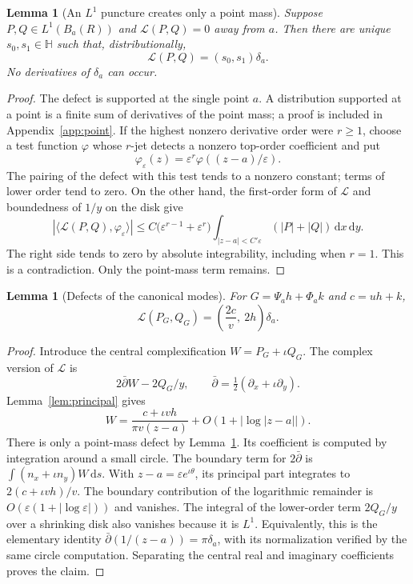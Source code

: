 \documentclass[11pt,a4paper]{article}
\numberwithin{equation}{section}
\newtheorem{lemma}[theorem]{Lemma}
\theoremstyle{definition}
\theoremstyle{remark}
\newcommand{\HH}{\mathbb H}
\newcommand{\dd}{\,\mathrm d}
\newcommand{\ds}{\,\mathrm ds}
\begin{document}
\begin{lemma}[An $L^1$ puncture creates only a point mass]
\label{lem:defect}
Suppose $P,Q\in L^1(B_a(R))$ and $\mathscr L(P,Q)=0$ away from $a$.
Then there are unique $s_0,s_1\in\HH$ such that, distributionally,
\begin{equation}\label{eq:defect}
 \mathscr L(P,Q)=(s_0,s_1)\delta_a.
\end{equation}
No derivatives of $\delta_a$ can occur.
\end{lemma}
\begin{proof}
The defect is supported at the single point $a$. A distribution
supported at a point is a finite sum of derivatives of the point mass;
a proof is included in Appendix~\ref{app:point}. If the highest nonzero
derivative order were $r\ge1$, choose a test function $\varphi$ whose
$r$-jet detects a nonzero top-order coefficient and put
\[
 \varphi_\varepsilon(z)=\varepsilon^r
                    \varphi((z-a)/\varepsilon).
\]
The pairing of the defect with this test tends to a nonzero constant;
terms of lower order tend to zero. On the other hand, the first-order
form of $\mathscr L$ and boundedness of $1/y$ on the disk give
\[
 |\langle\mathscr L(P,Q),\varphi_\varepsilon\rangle|
 \le C\bigl(\varepsilon^{r-1}+\varepsilon^r\bigr)
       \int_{|z-a|<C'\varepsilon}(|P|+|Q|)\dd x\dd y.
\]
The right side tends to zero by absolute integrability, including when
$r=1$. This is a contradiction. Only the point-mass term remains.
\end{proof}

\begin{lemma}[Defects of the canonical modes]\label{lem:mode-defect}
For $G=\Psi_a h+\Phi_a k$ and $c=uh+k$,
\begin{equation}\label{eq:mode-defect}
 \mathscr L(P_G,Q_G)=\left(\frac{2c}{v},\ 2h\right)\delta_a.
\end{equation}
\end{lemma}
\begin{proof}
Introduce the central complexification $W=P_G+\iota Q_G$. The complex
version of $\mathscr L$ is
\[
 2\bar\partial W-2Q_G/y,\qquad
 \bar\partial=\tfrac12(\partial_x+\iota\partial_y).
\]
Lemma~\ref{lem:principal} gives
\begin{equation}\label{eq:W-principal}
 W=\frac{c+\iota vh}{\pi v(z-a)}+O(1+|\log|z-a||).
\end{equation}
There is only a point-mass defect by Lemma~\ref{lem:defect}. Its
coefficient is computed by integration around a small circle. The
boundary term for $2\bar\partial$ is
$\int(n_x+\iota n_y)W\ds$. With
$z-a=\varepsilon e^{\iota\theta}$, its principal part integrates to
$2(c+\iota vh)/v$. The boundary contribution of the logarithmic
remainder is $O(\varepsilon(1+|\log\varepsilon|))$ and vanishes.
The integral of the lower-order term $2Q_G/y$ over a shrinking disk
also vanishes because it is $L^1$. Equivalently, this is the elementary
identity $\bar\partial(1/(z-a))=\pi\delta_a$, with its normalization
verified by the same circle computation. Separating the central real
and imaginary coefficients proves the claim.
\end{proof}
\end{document}
